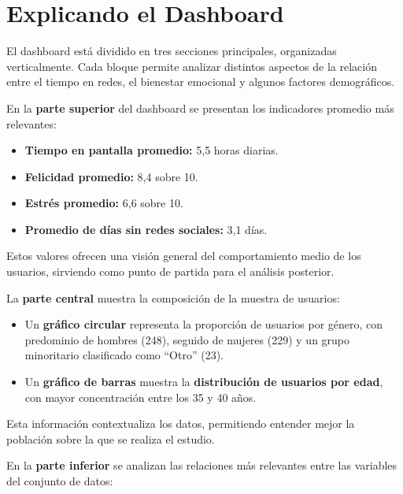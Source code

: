 \documentclass{../../../miPlantilla}
\begin{document}
\maketitle

\section{Explicando el Dashboard}

El dashboard está dividido en tres secciones principales, organizadas verticalmente. Cada bloque permite analizar distintos aspectos de la relación entre el tiempo en redes, el bienestar emocional y algunos factores demográficos.

En la \textbf{parte superior} del dashboard se presentan los indicadores promedio más relevantes:


\begin{itemize}
  \item \textbf{Tiempo en pantalla promedio:} 5,5 horas diarias.
  \item \textbf{Felicidad promedio:} 8,4 sobre 10.
  \item \textbf{Estrés promedio:} 6,6 sobre 10.
  \item \textbf{Promedio de días sin redes sociales:} 3,1 días.
\end{itemize}

Estos valores ofrecen una visión general del comportamiento medio de los usuarios, sirviendo como punto de partida para el análisis posterior.

La \textbf{parte central} muestra la composición de la muestra de usuarios:


\begin{itemize}
  \item Un \textbf{gráfico circular} representa la proporción de usuarios por género, con predominio de hombres (248), seguido de mujeres (229) y un grupo minoritario clasificado como “Otro” (23).
  \item Un \textbf{gráfico de barras} muestra la \textbf{distribución de usuarios por edad}, con mayor concentración entre los 35 y 40 años.
\end{itemize}

Esta información contextualiza los datos, permitiendo entender mejor la población sobre la que se realiza el estudio.

En la \textbf{parte inferior} se analizan las relaciones más relevantes entre las variables del conjunto de datos:
\end{document}
